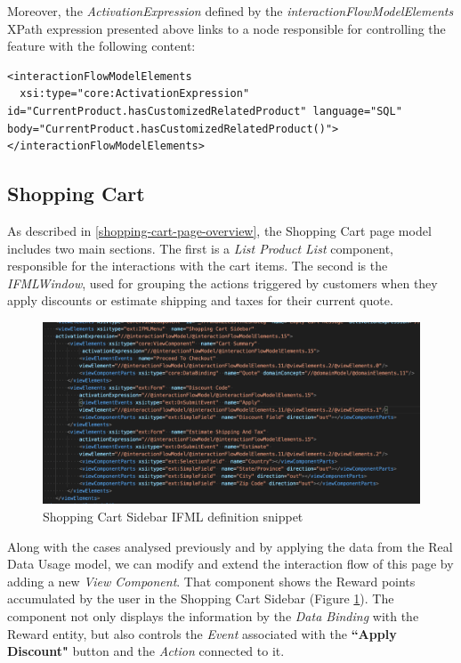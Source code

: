 Moreover, the \textit{ActivationExpression} defined by the \textit{interactionFlowModelElements} XPath expression presented above links to a node responsible for controlling the feature with the following content:

\vspace{0.5cm}
\lstset{language=XML}
\begin{lstlisting} 
<interactionFlowModelElements 
  xsi:type="core:ActivationExpression" id="CurrentProduct.hasCustomizedRelatedProduct" language="SQL" body="CurrentProduct.hasCustomizedRelatedProduct()">
</interactionFlowModelElements>

\end{lstlisting}
\newpage
\vspace{0.5cm}
\subsection{Shopping Cart}
\label{shopping-cart-updates}

As described in \ref{shopping-cart-page-overview}, the Shopping Cart page model includes two main sections. The first is a \textit{List Product List} component, responsible for the interactions with the cart items. The second is the \textit{IFMLWindow}, used for grouping the actions triggered by customers when they apply discounts or estimate shipping and taxes for their current quote.

\vspace{0.5cm}
\begin{figure}[H]
  \centering
    \includegraphics[width=12cm]{images/madison/ifml-shopping-cart-sidebar.png}
  \caption{Shopping Cart Sidebar IFML definition snippet}
  \label{fig:shopping-cart-sidebar-ifml-definition}
\end{figure}
\vspace{0.5cm}

Along with the cases analysed previously and by applying the data from the Real Data Usage model, we can modify and extend the interaction flow of this page by adding a new \textit{View Component}. That component shows the Reward points accumulated by the user in the Shopping Cart Sidebar (Figure \ref{fig:shopping-cart-sidebar-ifml-definition}). The component not only displays the information by the \textit{Data Binding} with the Reward entity, but also controls the \textit{Event} associated with the \textbf{``Apply Discount"} button and the \textit{Action} connected to it. 

